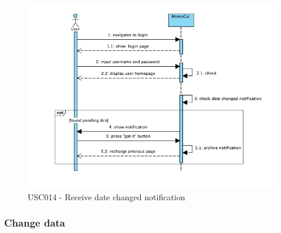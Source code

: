 \documentclass[10pt,a4paper,titlepage]{article}
\begin{document}
\begin{figure}[h]
\centering
\includegraphics[width=\linewidth]{./Sequence_diag/USC014.png}
\caption[USC014]{USC014 - Receive date changed notification}
\label{fig:USC014}
\end{figure}

\clearpage
\subsubsection{Change data} 
\end{document}
